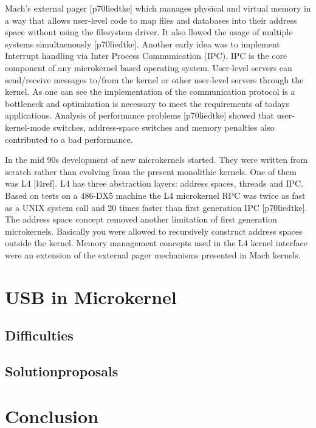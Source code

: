 \documentclass{acm_proc_article-sp}
\begin{document}
Mach's external pager [p70liedtke] which manages physical and virtual memory in a way that allows
user-level code to map files and databases into their address space without using the filesystem
driver.
It also llowed the usage of multiple systems simultaenously [p70liedtke].
Another early idea was to implement Interrupt handling via Inter Process Communication (IPC).
IPC is the core component of any microkernel based operating system.
User-level servers can send/receive messages to/from the kernel or other user-level servers
through the kernel.
As one can see the implementation of the communication protocol is a bottleneck and optimization
is necessary to meet the requirements of todays applications.
Analysis of performance problems [p70liedtke] showed that user-kernel-mode switches, address-space
switches and memory penalties also contributed to a bad performance.

In the mid 90s development of new microkernels started.
They were written from scratch rather than evolving from the present monolithic kernels.
One of them was L4 [l4ref].
L4 has three abstraction layers: address spaces, threads and IPC.
Based on tests on a 486-DX5 machine the L4 microkernel RPC was twice as fast as a UNIX system call
and 20 times faster than first generation IPC [p70liedtke].
The address space concept removed another limitation of first generation microkernels.
Basically you were allowed to recursively construct address spaces outside the kernel.
Memory management concepts used in the L4 kernel interface were an extension of the external
pager mechanisms presented in Mach kernels.

\section{USB in Microkernel}
\subsection{Difficulties}
\subsection{Solutionproposals}
\section{Conclusion}
\section{}
\end{document}

